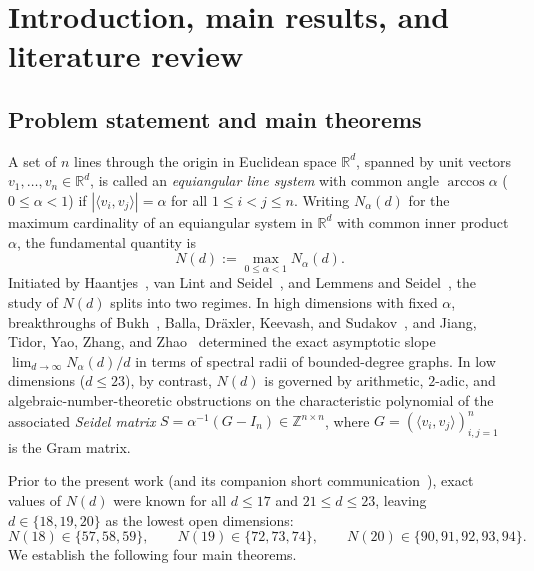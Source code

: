 \documentclass[11pt,reqno]{amsart}
\theoremstyle{definition}
\theoremstyle{remark}
\numberwithin{equation}{section}
\numberwithin{table}{section}
\begin{document}
\maketitle
\setcounter{tocdepth}{2}
\tableofcontents

\section{Introduction, main results, and literature review}\label{sec:intro}

\subsection{Problem statement and main theorems}
A set of $n$ lines through the origin in Euclidean space $\mathbb{R}^d$, spanned by unit vectors $v_1, \dots, v_n \in \mathbb{R}^d$, is called an \emph{equiangular line system} with common angle $\arccos\alpha$ ($0 \le \alpha < 1$) if $|\langle v_i, v_j \rangle| = \alpha$ for all $1 \le i < j \le n$. Writing $N_\alpha(d)$ for the maximum cardinality of an equiangular system in $\mathbb{R}^d$ with common inner product $\alpha$, the fundamental quantity is
\[
  N(d) := \max_{0 \le \alpha < 1} N_\alpha(d).
\]
Initiated by Haantjes~\cite{Haantjes1948}, van Lint and Seidel~\cite{vanLintSeidel1966}, and Lemmens and Seidel~\cite{LemmensSeidel1973}, the study of $N(d)$ splits into two regimes. In high dimensions with fixed $\alpha$, breakthroughs of Bukh~\cite{Bukh2016}, Balla, Dr\"axler, Keevash, and Sudakov~\cite{BDKS2018}, and Jiang, Tidor, Yao, Zhang, and Zhao~\cite{JTYZZ2021} determined the exact asymptotic slope $\lim_{d\to\infty} N_\alpha(d)/d$ in terms of spectral radii of bounded-degree graphs. In low dimensions ($d \le 23$), by contrast, $N(d)$ is governed by arithmetic, $2$-adic, and algebraic-number-theoretic obstructions on the characteristic polynomial of the associated \emph{Seidel matrix} $S = \alpha^{-1}(G - I_n) \in \mathbb{Z}^{n \times n}$, where $G = (\langle v_i, v_j \rangle)_{i,j=1}^n$ is the Gram matrix.

Prior to the present work (and its companion short communication~\cite{CompanionMRL}), exact values of $N(d)$ were known for all $d \le 17$ and $21 \le d \le 23$, leaving $d \in \{18, 19, 20\}$ as the lowest open dimensions:
\[
  N(18) \in \{57, 58, 59\}, \qquad N(19) \in \{72, 73, 74\}, \qquad N(20) \in \{90, 91, 92, 93, 94\}.
\]
We establish the following four main theorems.
\end{document}

